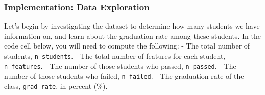 \documentclass{ctexart}
\begin{document}
    \subsubsection{Implementation: Data
Exploration}\label{implementation-data-exploration}

Let's begin by investigating the dataset to determine how many students
we have information on, and learn about the graduation rate among these
students. In the code cell below, you will need to compute the
following: - The total number of students, \texttt{n\_students}. - The
total number of features for each student, \texttt{n\_features}. - The
number of those students who passed, \texttt{n\_passed}. - The number of
those students who failed, \texttt{n\_failed}. - The graduation rate of
the class, \texttt{grad\_rate}, in percent (\%).
\end{document}
